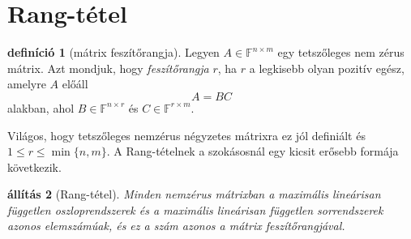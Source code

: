 \documentclass[9pt, a4paper, showtrims]{memoir}
\theoremstyle{plain}
\newtheorem{proposition}{állítás}[chapter]
\theoremstyle{remark}
\theoremstyle{definition}
\newtheorem{definition}[proposition]{definíció}
\begin{document}
\section{Rang-tétel}
\begin{definition}[mátrix feszítőrangja]
	Legyen $A\in\mathbb{F}^{n\times m}$ egy tetszőleges nem zérus mátrix.
    Azt mondjuk, hogy \emph{feszítőrangja} $r$, ha $r$ a legkisebb olyan pozitív egész, amelyre $A$ előáll
	\[
		A=BC
	\]
	alakban, ahol $B\in\mathbb{F}^{n\times r}$ és $C\in\mathbb{F}^{r\times m}$.
\end{definition}
Világos, hogy tetszőleges nemzérus négyzetes mátrixra ez jól definiált és $1\leq r \leq \min\{n,m\}$.
A Rang-tételnek a szokásosnál egy kicsit erősebb formája következik.

\begin{proposition}[Rang-tétel]
	Minden nemzérus mátrixban
	a maximális lineárisan független oszloprendszerek
	és a max\-i\-má\-lis lineárisan független sorrendszerek azonos elemszámúak,
	és ez a szám azonos a mátrix feszítőrangjával.
    \label{pr:rang}
\end{proposition}
\end{document}

